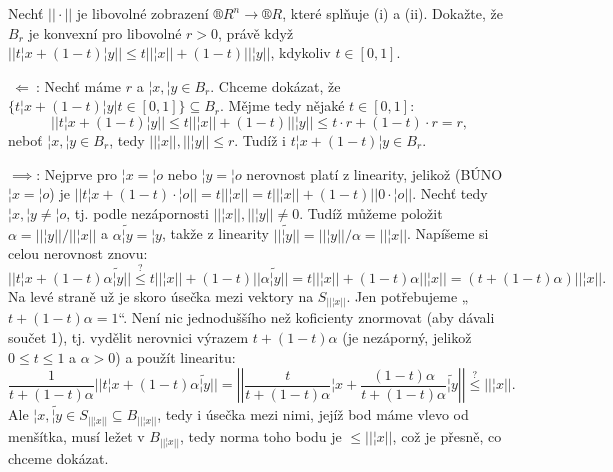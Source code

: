 \documentclass[12pt]{article}					%
\begin{document}
    \begin{priklad}[8.2]
        Nechť $||·||$ je libovolné zobrazení $®R^n \rightarrow ®R$, které splňuje (i) a (ii). Dokažte, že $B_r$ je konvexní pro libovolné $r > 0$, právě když $||t¦x + (1−t)¦y|| ≤ t||¦x|| + (1−t) ||¦y||$, kdykoliv $t \in [0,1]$.

        \begin{dukazin}
            $\ \Longleftarrow\ $: Nechť máme $r$ a $¦x, ¦y \in B_r$. Chceme dokázat, že $\{t¦x+(1−t)¦y | t \in [0,1]\} \subseteq B_r$. Mějme tedy nějaké $t \in [0, 1]$:
            $$ ||t¦x + (1−t)¦y|| ≤ t||¦x|| + (1−t) ||¦y|| ≤ t·r + (1-t)·r = r, $$
            neboť $¦x, ¦y \in B_r$, tedy $||¦x||, ||¦y|| ≤ r$. Tudíž i $t¦x + (1−t)¦y \in B_r$.

            \noindent$\implies$: Nejprve pro $¦x = ¦o$ nebo $¦y = ¦o$ nerovnost platí z linearity, jelikož (BÚNO $¦x = ¦o$) je $||t¦x + (1-t)·¦o|| = t||¦x|| = t||¦x|| + (1-t)||0·¦o||$. Nechť tedy $¦x, ¦y ≠ ¦o$, tj. podle nezápornosti $||¦x||, ||¦y|| ≠ 0$. Tudíž můžeme položit $\alpha = ||¦y||/||¦x||$ a $\alpha\tilde{¦y} = ¦y$, takže z linearity $||\tilde{¦y}|| = ||¦y||/\alpha = ||¦x||$. Napíšeme si celou nerovnost znovu:
            $$ ||t¦x + (1−t)\alpha\tilde{¦y}|| \overset{?}{≤} t||¦x|| + (1−t)||\alpha\tilde{¦y}|| = t||¦x|| + (1−t)\alpha||¦x|| = (t + (1-t)\alpha)||¦x||. $$
            Na levé straně už je skoro úsečka mezi vektory na $S_{||¦x||}$. Jen potřebujeme „$t + (1-t)\alpha = 1$“. Není nic jednoduššího než koficienty znormovat (aby dávali součet 1), tj. vydělit nerovnici výrazem $t + (1-t)\alpha$ (je nezáporný, jelikož $0 ≤ t ≤ 1$ a $\alpha > 0$) a použít linearitu:
            $$ \frac{1}{t + (1-t)\alpha}||t¦x + (1−t)\alpha\tilde{¦y}|| = \left|\left|\frac{t}{t + (1-t)\alpha}¦x + \frac{(1-t)\alpha}{t + (1-t)\alpha}\tilde{¦y}\right|\right| \overset{?}{≤} ||¦x||. $$
            Ale $¦x, \tilde{¦y} \in S_{||¦x||} \subseteq B_{||¦x||}$, tedy i úsečka mezi nimi, jejíž bod máme vlevo od menšítka, musí ležet v $B_{||¦x||}$, tedy norma toho bodu je $≤ ||¦x||$, což je přesně, co chceme dokázat.
        \end{dukazin}
    \end{priklad}

\pagebreak
\end{document}
